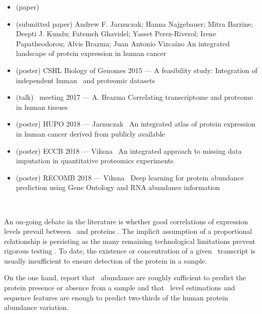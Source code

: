\clearpage
\derivativeWork{}
\begin{itemize}[topsep=0pt,nosep]
    \item (paper) 
    \item (submitted paper) Andrew F. Jarnuczak; Hanna Najgebauer; Mitra Barzine;
        Deepti J. Kundu; Fatemeh Ghavidel; Yasset Perez-Riverol; Irene Papatheodorou; Alvis Brazma;
        Juan Antonio Vizcaíno An integrated landscape of protein expression in human cancer
    \item (poster) CSHL  Biology of Genomes 2015 --- A feasibility study:
        Integration of independent human \Rnaseq\ and proteomic datasets
    \item (talk) \gtex\ meeting 2017 --- A. Brazma Correlating transcriptome
        and proteome in human tissues
    \item (poster) HUPO 2018 --- Jarnuczak \etal\ An integrated atlas of
        protein expression in human cancer derived from publicly available
    \item (poster) ECCB 2018 --- Viksna \etal\ An integrated approach
        to missing data imputation in quantitative proteomics experiments
    \item (poster) RECOMB 2018 --- Viksna \etal\ Deep learning
        for protein abundance prediction using Gene Ontology and RNA abundance information
\end{itemize}

\clearpage\


An on-going debate in the literature is
whether good correlations of expression levels prevail
between \mRNAs\ and proteins .
The implicit assumption of a proportional relationship is persisting
as the many remaining technological limitations prevent
rigorous testing .
To date, the existence or concentration of a given \mRNA\ transcript
is usually insufficient to ensure detection of the protein in a sample.\mybr\

On the one hand,
\citet{Ramakrishnan2009-lv} report that
\mRNAs\ abundance are roughly sufficient to predict
the protein presence or absence from a sample and
\citet{Vogel2010-ux} that
\mRNA\ level estimations and sequence features are enough to predict
two-thirds of the human protein abundance variation.\mybr\

